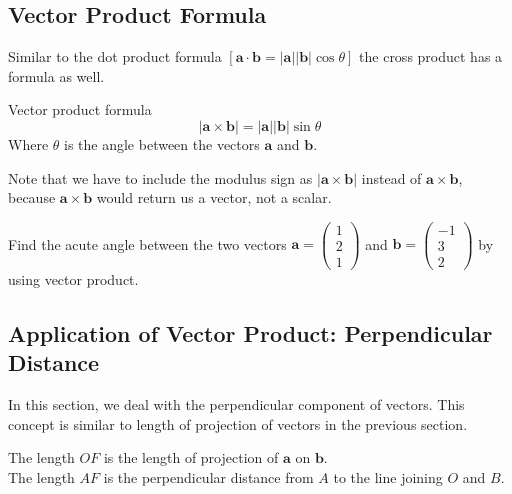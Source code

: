 \documentclass[a4paper]{book}
\newcommand{\cvv}[3]{\begin{pmatrix}#1\\#2\\#3\end{pmatrix}}
\begin{document}
\subsection{Vector Product Formula}
Similar to the dot product formula $[\mathbf a\cdot\mathbf b=|\mathbf a||\mathbf b|\cos\theta]$ the cross product has a formula as well.

\begin{theorem}{Vector product formula}
\[
|\mathbf a\times\mathbf b|=|\mathbf a||\mathbf b|\sin\theta
\]
Where $\theta$ is the angle between the vectors $\mathbf a$ and $\mathbf b$.
\end{theorem}

Note that we have to include the modulus sign as $|\mathbf a\times\mathbf b|$ instead of $\mathbf a\times\mathbf b$, because $\mathbf a\times\mathbf b$ would return us a vector, not a scalar.

\begin{example}
Find the acute angle between the two vectors $\mathbf a=\cvv{1}{2}{1}$ and $\mathbf b=\cvv{-1}{3}{2}$ by using vector product.
\end{example}
\solution{
\[
\begin{aligned}
\left|\cvv{1}{2}{1}\times\cvv{-1}{3}{2}\right|&=\left|\cvv{1}{2}{1}\right|\left|\cvv{-1}{3}{2}\right|\sin\theta\\
\left|\cvv{4-3}{-1-2}{3-(-2)}\right|&=\sqrt6\sqrt{14}\sin\theta\\
\left|\cvv{1}{-3}{5}\right|&=\sqrt6\sqrt{14}\sin\theta\\
\frac{\sqrt{35}}{\sqrt6\sqrt{14}}&=\sin\theta\\
\theta&=40.2^\circ
\end{aligned}
\]}




\clearpage
\subsection{Application of Vector Product: Perpendicular Distance}
In this section, we deal with the perpendicular component of vectors. This concept is similar to length of projection of vectors in the previous section.

\begin{center}

The length $OF$ is the length of projection of $\mathbf a$ on $\mathbf b$.\\
The length $AF$ is the perpendicular distance from $A$ to the line joining $O$ and $B$.
\end{center}
\end{document}
